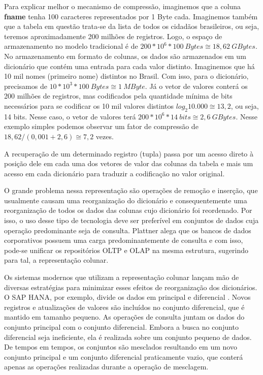 Para explicar melhor o mecanismo de compressão, imaginemos que a coluna \textbf{fname} tenha 
100 caracteres representados por 1 Byte cada. Imaginemos também que a tabela em questão trata-se 
da lista de todos os cidadãos brasileiros, ou seja, teremos aproximadamente 200 milhões de registros. 
Logo, o espaço de armazenamento no modelo tradicional é de $200*10^6 * 100~Bytes \cong 18,62~GBytes$. 
No armazenamento em formato de colunas, os dados são armazenados em um dicionário que contém uma 
entrada para cada valor distinto. Imaginemos que há 10 mil nomes (primeiro nome) distintos no Brasil. 
Com isso, para o dicionário, precisamos de $10*10^3 * 100~Bytes \cong 1~MByte$. Já o vetor de 
valores conterá os 200 milhões de registros, mas codificados pela quantidade mínima de bits 
necessários para se codificar os 10 mil valores distintos $log_2 10.000 \cong 13,2$, ou seja, 
14 bits. Nesse caso, o vetor de valores terá $200*10^6 * 14~bits \cong 2,6~GBytes$. Nesse exemplo simples 
podemos observar um fator de compressão de $18,62 / (0,001 + 2,6) \cong 7,2$ vezes.

A recuperação de um determinado registro (tupla) passa por um acesso direto à posição dele em 
cada uma dos vetores de valor das colunas da tabela e mais um acesso em cada dicionário para traduzir 
a codificação no valor original.

O grande problema nessa representação são operações de remoção e inserção, que usualmente causam uma 
reorganização do dicionário e consequentemente uma reorganização de todos os dados das colunas cujo 
dicionário foi reordenado. Por isso, o uso desse tipo de tecnologia deve ser preferível em conjuntos 
de dados cuja operação predominante seja de consulta. Plattner \cite{plattner2009common} alega que 
os bancos de dados corporativos possuem uma carga predominantemente de consulta e com isso, 
pode-se unificar os repositórios OLTP e OLAP na mesma estrutura, sugerindo para tal, a representação colunar. 

Os sistemas modernos que utilizam a representação colunar lançam mão de diversas estratégias para 
minimizar esses efeitos de reorganização dos dicionários. O SAP HANA, por exemplo, divide os dados 
em principal e diferencial \cite{plattner2012memory}. Novos registros e atualizações de valores são 
incluídos no conjunto diferencial, que é mantido em tamanho pequeno. As operações de consulta juntam 
os dados do conjunto principal com o conjunto diferencial. Embora a busca no conjunto diferencial seja 
ineficiente, ela é realizada sobre um conjunto pequeno de dados. De tempos em tempos, os conjuntos são 
mesclados resultando em um novo conjunto principal e um conjunto diferencial praticamente vazio, que 
conterá apenas as operações realizadas durante a operação de mesclagem. 

